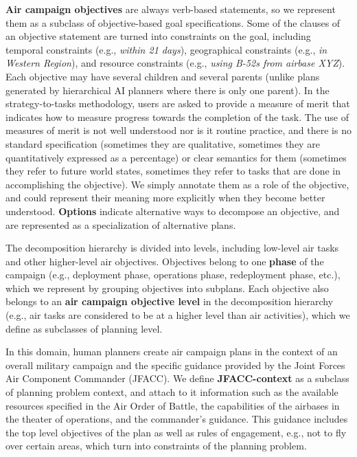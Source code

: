 {\bf Air campaign objectives} are always verb-based statements,
so we represent them as a 
subclass of objective-based goal specifications.
Some of the clauses of an objective statement 
are turned into constraints on the goal, including
temporal constraints (e.g., {\em within 21 days}), 
geographical constraints (e.g., {\em in Western Region}),
and resource constraints (e.g., {\em using B-52s from airbase XYZ}).
Each objective may have several children and several parents
(unlike plans generated by hierarchical AI planners where 
there is only one parent).  
In the strategy-to-tasks methodology, users are asked to provide a 
measure of merit that indicates how to measure progress towards 
the completion of the task.  The use of measures of merit 
is not well understood nor is it routine practice, 
and there is no standard specification
(sometimes they are qualitative, 
sometimes they are quantitatively expressed as a percentage)
or clear semantics for them 
(sometimes they refer to future world states, 
sometimes they refer to tasks that are done in accomplishing 
the objective).  
We simply annotate them as a role of the objective,
and could represent their meaning more explicitly when
they become better understood.
{\bf Options} indicate alternative ways to decompose 
an objective, and 
are represented as a specialization of alternative plans.  

The decomposition hierarchy is divided into levels,
including low-level air tasks 
and other higher-level air objectives.  
Objectives belong to one 
{\bf phase} of the campaign
(e.g., deployment phase, operations phase, redeployment phase, etc.),
which we represent by grouping objectives into subplans.  
Each objective also belongs 
to an {\bf air campaign objective level} 
in the decomposition hierarchy
(e.g., air tasks are considered to be at a higher level than
air activities),
which we define as subclasses of planning level.  

In this domain, 
human planners create air campaign plans in the context of 
an overall military campaign and 
the specific guidance provided by the 
Joint Forces Air Component Commander (JFACC).
We define {\bf JFACC-context} as a subclass of planning problem context,
and attach to it information such as 
the available resources specified in the Air Order of Battle, 
the capabilities of the airbases in the theater of operations, 
and the commander's guidance.
This guidance includes the top level objectives of the plan as well as
rules of engagement, e.g., not to fly over certain areas, which turn
into constraints of the planning problem.



